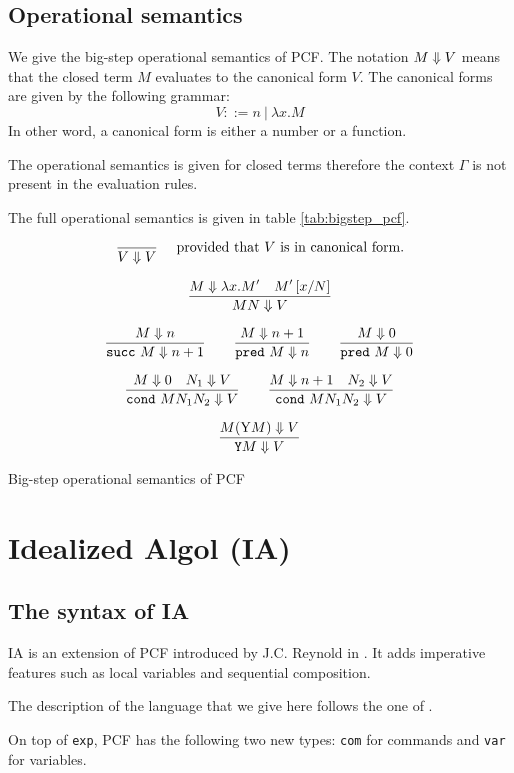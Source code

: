 \subsection{Operational semantics}

We give the big-step operational semantics of PCF. The notation $M \Downarrow V$ means
that the closed term $M$ evaluates to the canonical form $V$. The canonical forms are given by the following
grammar:
$$V ::= n\ |\ \lambda x. M$$
In other word, a canonical form is either a number or a function.

The operational semantics is given for closed terms therefore the context $\Gamma$ is not present in
the evaluation rules.

The full operational semantics is given in table \ref{tab:bigstep_pcf}.

\begin{table}[htbp]
$$\frac{\displaystyle }{V \Downarrow V} \quad \mbox{ provided that $V$ is in canonical form.} $$

$$ \frac{\displaystyle M \Downarrow \lambda x. M' \quad M'\left[ x/N \right]}{M N \Downarrow V}$$

$$\frac{\displaystyle M \Downarrow n}{\texttt{succ}\ M \Downarrow n+1}
\qquad \frac{\displaystyle M \Downarrow n+1}{\texttt{pred}\ M \Downarrow n}
\qquad \frac{\displaystyle M \Downarrow 0}{\texttt{pred}\ M \Downarrow 0}$$

$$\frac{\displaystyle M \Downarrow 0 \quad N_1 \Downarrow V}{\texttt{cond}\ M N_1 N_2  \Downarrow V}
\qquad
 \frac{\displaystyle M \Downarrow n+1 \quad N_2 \Downarrow V}{\texttt{cond}\ M N_1 N_2  \Downarrow V}$$

$$\frac{\displaystyle M (\mathrm{Y} M) \Downarrow V }{\texttt{Y} M \Downarrow V}$$
\label{tab:bigstep_pcf}
\caption{Big-step operational semantics of PCF}
\end{table}



\section{Idealized Algol (IA)}
\label{sec:ia}

\subsection{The syntax of IA}
IA is an extension of PCF introduced by J.C. Reynold in
\cite{Reynolds81}. It adds imperative features such as local variables and sequential composition.

The description of the language that we give here follows the one of \cite{abramsky:game-semantics}.

On top of \texttt{exp}, PCF has the following two new types:
 \texttt{com} for commands and \texttt{var} for variables.

